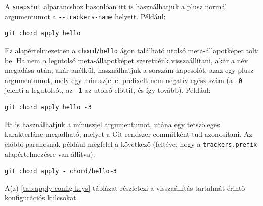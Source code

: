 \documentclass[
]{elteikthesis}[2025/03/25]
\begin{document}
A \verb|snapshot| alparancshoz hasonlóan itt is használhatjuk a plusz normál argumentumot a \verb|--trackers-name| helyett.
Például:

\begin{verbatim}
git chord apply hello
\end{verbatim}

Ez alapértelmezetten a \verb|chord/hello| ágon található utolsó meta-állapotképet tölti be.
Ha nem a legutolsó meta-állapotképet szeretnénk visszaállítani, akár a név megadása után, akár anélkül,
használhatjuk a sorszám-kapcsolót, azaz egy plusz argumentumot, mely egy mínuszjellel prefixelt nem-negatív egész szám
(a \verb|-0| jelenti a legutolsót, az \verb|-1| az utolsó előttit, és így tovább).
Például:

\begin{verbatim}
git chord apply hello -3
\end{verbatim}

Itt is használhatjuk a mínuszjel argumentumot, utána egy tetszőleges karakterlánc megadható,
melyet a Git rendszer commitként tud azonosítani.
Az előbbi parancsnak például megfelel a következő (feltéve, hogy a \verb|trackers.prefix| alapértelmezésre van állítva):

\begin{verbatim}
git chord apply - chord/hello~3
\end{verbatim}

A(z) \ref{tab:apply-config-keys} táblázat részletezi a visszaállítás tartalmát érintő konfigurációs kulcsokat.
\end{document}
